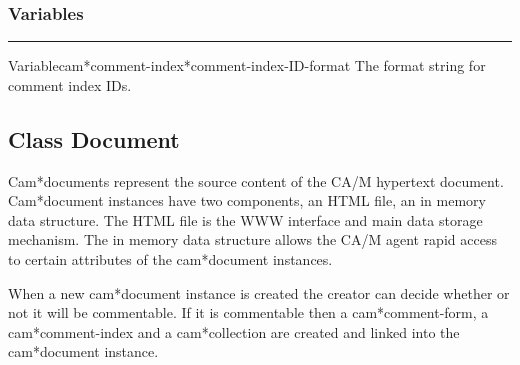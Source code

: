 \subsubsection*{Variables}
\par\vspace*{0.00in}\par\hrule\par\medskip\par


\begin{functiondoc}{Variable}{cam*comment-index*comment-index-ID-format}{}
The format string for comment index IDs.
\end{functiondoc}


\clearpage

\subsection{Class Document}


Cam*documents represent the source content of the CA/M hypertext document.
Cam*document instances have two components, an HTML file, an in memory
data structure.  The HTML file is the WWW interface and main data storage
mechanism.  The in memory data structure allows the CA/M agent rapid access
to certain attributes of the cam*document instances.

When a new cam*document instance is created the creator can decide whether
or not it will be commentable.  If it is commentable then a
cam*comment-form, a cam*comment-index and a cam*collection are created and
linked into the cam*document instance.

